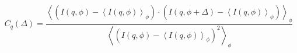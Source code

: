 \documentclass[12pt]{article}
\begin{document}
\begin{equation*}\label{xcca}
C_{q}(\Delta) = \frac{\left\langle \left(I(q,\phi)-\left\langle I(q,\phi)\right\rangle_{\phi}\right)\cdot\left(I(q,\phi+\Delta)-\left\langle I(q,\phi)\right\rangle_{\phi}\right)\right\rangle_{\phi}}
{\left\langle \left(I(q,\phi)-\left\langle I(q,\phi)\right\rangle_{\phi}\right)^2\right\rangle_{\phi}}
\end{equation*}
\end{document}
